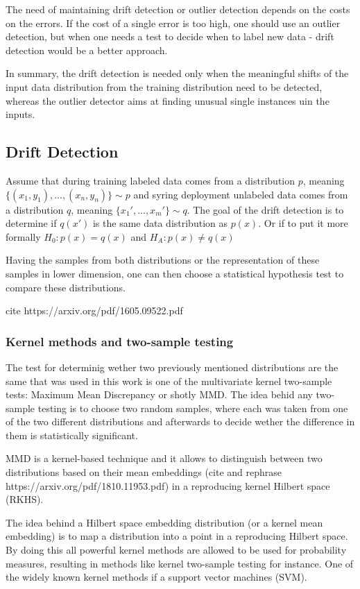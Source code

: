 The need of maintaining drift detection or outlier detection depends on the costs on the errors. If the cost of a single error is too high, one should use an outlier detection, but when one needs a test to decide when to label new data - drift detection would be a better approach.

In summary, the drift detection is needed only when the meaningful shifts of the input data distribution from the training distribution need to be detected, whereas the outlier detector aims at finding unusual single instances uin the inputs.

\subsection{Drift Detection}
Assume that during training labeled data comes from a distribution $p$, meaning $\{(x_1, y_1), ..., (x_n, y_n)\} \sim p$ and syring deployment unlabeled data comes from a distribution $q$, meaning $\{x_1', ..., x_m'\} \sim q$. The goal of the drift detection is to determine if $q(x')$ is the same data distribution as $p(x)$. Or if to put it more formally $H_0:p(x) = q(x)$ and $H_A:p(x) \neq q(x)$

Having the samples from both distributions or the representation of these samples in lower dimension, one can then choose a statistical hypothesis test to compare these distributions. 

cite https://arxiv.org/pdf/1605.09522.pdf

\subsubsection{Kernel methods and two-sample testing}

The test for determinig wether two previously mentioned distributions are the same that was used in this work is one of the multivariate kernel two-sample tests: Maximum Mean Discrepancy or shotly MMD. The idea behid any two-sample testing is to choose two random samples, where each was taken from one of the two different distributions and afterwards to decide wether the difference in them is statistically significant. 

MMD is a kernel-based technique and it allows to distinguish between two distributions based on their mean embeddings (cite and rephrase https://arxiv.org/pdf/1810.11953.pdf) in a reproducing kernel Hilbert space (RKHS).

The idea behind a Hilbert space embedding distribution (or a kernel mean embedding) is to map a distribution into a point in a reproducing Hilbert space. By doing this all powerful kernel methods are allowed to be used for probability measures, resulting in methods like kernel two-sample testing for instance. One of the widely known kernel methods if a support vector machines (SVM).

